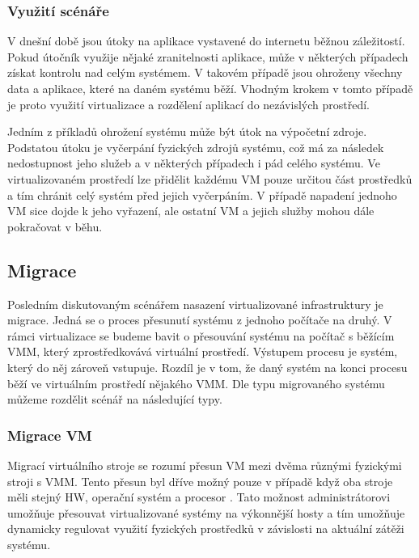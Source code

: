 \subsubsection*{Využití scénáře}

V dnešní době jsou útoky na aplikace vystavené do internetu běžnou záležitostí. Pokud útočník využije nějaké zranitelnosti aplikace, může v některých případech získat kontrolu nad celým systémem. V takovém případě jsou
ohroženy všechny data a aplikace, které na daném systému běží. Vhodným krokem v tomto případě je proto využití virtualizace a rozdělení aplikací do nezávislých prostředí.

Jedním z příkladů ohrožení systému může být útok na výpočetní zdroje. Podstatou útoku je vyčerpání fyzických zdrojů systému, což má za následek nedostupnost jeho služeb a v některých případech i pád celého systému.
Ve virtualizovaném prostředí lze přidělit každému VM pouze určitou část prostředků a tím chránit celý systém před jejich vyčerpáním. V případě napadení jednoho VM sice dojde k jeho vyřazení, ale ostatní VM a jejich služby
mohou dále pokračovat v běhu.

\subsection{Migrace}

Posledním diskutovaným scénářem nasazení virtualizované infrastruktury je migrace. Jedná se o proces přesunutí systému z jednoho počítače na druhý. V rámci virtualizace se budeme bavit o přesouvání systému na počítač s běžícím VMM,
který zprostředkovává virtuální prostředí. Výstupem procesu je systém, který do něj zároveň vstupuje. Rozdíl je v tom, že daný systém na konci procesu běží ve virtuálním prostředí nějakého VMM. Dle typu migrovaného systému můžeme
rozdělit scénář na následující typy.

\subsubsection*{Migrace VM}

Migrací virtuálního stroje se rozumí přesun VM mezi dvěma různými fyzickými stroji s VMM. Tento přesun byl dříve možný pouze v případě když oba stroje měli stejný HW, operační systém a procesor \cite{reasons}.
Tato možnost administrátorovi umožňuje přesouvat virtualizované systémy na výkonnější hosty a tím umožňuje dynamicky regulovat využití fyzických prostředků v závislosti na aktuální zátěži systému.

